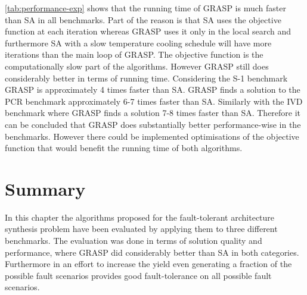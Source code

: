 \autoref{tab:performance-exp} shows that the running time of GRASP is much faster than SA in all benchmarks. Part of the reason is that SA uses the objective function at each iteration whereas GRASP uses it only in the local search and furthermore SA with a slow temperature cooling schedule will have more iterations than the main loop of GRASP. The objective function is the computationally slow part of the algorithms. However GRASP still does considerably better in terms of running time. Considering the S-1 benchmark GRASP is approximately 4 times faster than SA. GRASP finds a solution to the PCR benchmark approximately 6-7 times faster than SA. Similarly with the IVD benchmark where GRASP finds a solution 7-8 times faster than SA. Therefore it can be concluded that GRASP does substantially better performance-wise in the benchmarks. However there could be implemented optimisations of the objective function that would benefit the running time of both algorithms.

\section{Summary}
In this chapter the algorithms proposed for the fault-tolerant architecture synthesis problem have been evaluated by applying them to three different benchmarks. The evaluation was done in terms of solution quality and performance, where GRASP did considerably better than SA in both categories. Furthermore in an effort to increase the yield even generating a fraction of the possible fault scenarios provides good fault-tolerance on all possible fault scenarios.